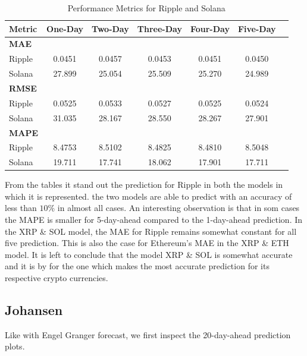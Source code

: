 \begin{table}[H]
\centering
\caption{Performance Metrics for Ripple and Solana}
\begin{tabular}{lcccccc}
\toprule
\textbf{Metric} & \textbf{One-Day} & \textbf{Two-Day} & \textbf{Three-Day} & \textbf{Four-Day} & \textbf{Five-Day} \\
\midrule
\textbf{MAE} & & & & & \\
Ripple        & 0.0451 & 0.0457 & 0.0453 & 0.0451 & 0.0450 \\
Solana        & 27.899 & 25.054 & 25.509 & 25.270 & 24.989 \\
\midrule
\textbf{RMSE} & & & & & \\
Ripple        & 0.0525 & 0.0533 & 0.0527 & 0.0525 & 0.0524 \\
Solana        & 31.035 & 28.167 & 28.550 & 28.267 & 27.901 \\
\midrule
\textbf{MAPE} & & & & & \\
Ripple        & 8.4753 & 8.5102 & 8.4825 & 8.4810 & 8.5048 \\
Solana        & 19.711 & 17.741 & 18.062 & 17.901 & 17.711 \\
\bottomrule
\end{tabular}
\end{table}
\noindent From the tables it stand out the prediction for Ripple in both the models in which it is represented. the two models are able to predict with an accuracy of less than $10\%$ in almost all cases. An interesting observation is that in som cases the MAPE is smaller for 5-day-ahead compared to the 1-day-ahead prediction. In the XRP \& SOL model, the MAE for Ripple remains somewhat constant for all five prediction. This is also the case for Ethereum's MAE in the XRP \& ETH model. It is left to conclude that the model XRP \& SOL is somewhat accurate and it is by for the one which makes the most accurate prediction for its respective crypto currencies.
\pause

\subsection{Johansen}
Like with Engel Granger forecast, we first inspect the 20-day-ahead prediction plots. 


